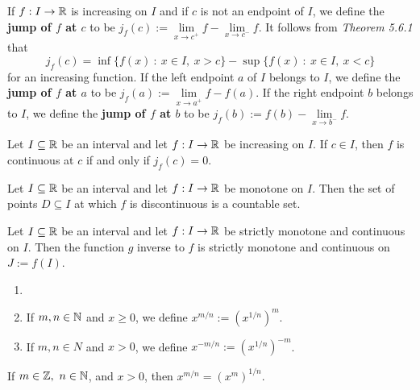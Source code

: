 \begin{definition}
	If $f:I \to \mathbb{R}$ is increasing on $I$ and if $c$ is not an endpoint of $I$, we define the \textbf{jump of $f$ at $c$} to be $j_f(c):=\lim\limits_{x \to c^+} f-\lim\limits_{x \to c^-} f$. It follows from \textit{Theorem 5.6.1} that
	\[j_f(c)=\inf \{f(x)\ :\ x \in I,\ x > c\}- \sup \{f(x)\ :\ x \in I,\ x < c\}\]
	for an increasing function. If the left endpoint $a$ of $I$ belongs to $I$, we define the \textbf{jump of $f$ at $a$} to be $j_f(a):=\lim\limits_{x \to a^+} f-f(a)$. If the right endpoint $b$ belongs to $I$, we define the \textbf{jump of $f$ at $b$} to be $j_f(b):=f(b)-\lim\limits_{x \to b^-} f$.
\end{definition}

\begin{theorem}
	Let $I \subseteq \mathbb{R}$ be an interval and let $f:I \rightarrow \mathbb{R}$ be increasing on $I$. If $c \in I$, then $f$ is continuous at $c$ if and only if $j_f(c)=0$.
\end{theorem}

\begin{theorem}
	Let $I \subseteq \mathbb{R}$ be an interval and let $f: I \rightarrow \mathbb{R}$ be monotone on $I$. Then the set of points $D \subseteq I$ at which $f$ is discontinuous is a countable set.
\end{theorem}

\begin{theorem}
	Let $I \subseteq \mathbb{R}$ be an interval and let $f:I \rightarrow \mathbb{R}$ be strictly monotone and continuous on $I$. Then the function $g$ inverse to $f$ is strictly monotone and continuous on $J:=f(I)$.
\end{theorem}

\begin{definition}
	\begin{enumerate}
		\item[]
		\item If $m,n \in \mathbb{N}$ and $x \geq 0$, we define $x^{m/n} := (x^{1/n})^m$.
		\item If $m,n \in N$ and $x > 0$, we define $x^{-m/n} := (x^{1/n})^{-m}$.
	\end{enumerate}
\end{definition}

\begin{theorem}
	If $m \in \mathbb{Z},\ n \in \mathbb{N}$, and $x > 0$, then $x^{m/n}=(x^m)^{1/n}$.
\end{theorem}
